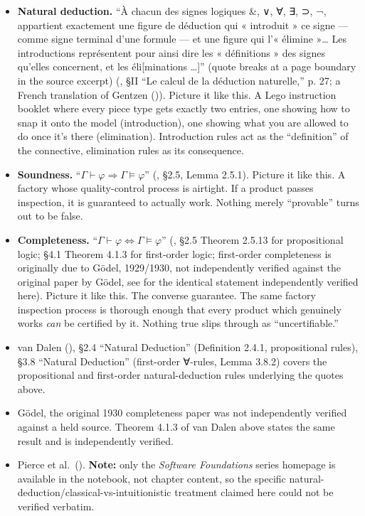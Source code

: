 \begin{itemize}
\tightlist
\item
  \textbf{Natural deduction.} ``À chacun des signes logiques \&, ∨, ∀, ∃, ⊃, ¬, appartient exactement une figure de déduction qui « introduit » ce signe --- comme signe terminal d'une formule --- et une figure qui l'« élimine »\ldots{} Les introductions représentent pour ainsi dire les « définitions » des signes qu'elles concernent, et les éli{[}minations \ldots{]}'' (quote breaks at a page boundary in the source excerpt) (\cite{FeysLadriere1955}, §II ``Le calcul de la déduction naturelle,'' p. 27; a French translation of Gentzen (\cite{Gentzen1935})). Picture it like this. A Lego instruction booklet where every piece type gets exactly two entries, one showing how to snap it onto the model (introduction), one showing what you are allowed to do once it's there (elimination). Introduction rules act as the ``definition'' of the connective, elimination rules as its consequence.
\item
  \textbf{Soundness.} ``\(\Gamma \vdash \varphi \Rightarrow \Gamma \models
  \varphi\)'' (\cite{VanDalen2013}, §2.5, Lemma 2.5.1). Picture it like this. A factory whose quality-control process is airtight. If a product passes inspection, it is guaranteed to actually work. Nothing merely ``provable'' turns out to be false.
\item
  \textbf{Completeness.} ``\(\Gamma \vdash \varphi \Leftrightarrow \Gamma
  \models \varphi\)'' (\cite{VanDalen2013}, §2.5 Theorem 2.5.13 for propositional logic; §4.1 Theorem 4.1.3 for first-order logic; first-order completeness is originally due to Gödel, 1929/1930, not independently verified against the original paper by Gödel, see \cite{VanDalen2013} for the identical statement independently verified here). Picture it like this. The converse guarantee. The same factory inspection process is thorough enough that every product which genuinely works \emph{can} be certified by it. Nothing true slips through as ``uncertifiable.''
\item
  van Dalen (\cite{VanDalen2013}), §2.4 ``Natural Deduction'' (Definition 2.4.1, propositional rules), §3.8 ``Natural Deduction'' (first-order ∀-rules, Lemma 3.8.2) covers the propositional and first-order natural-deduction rules underlying the quotes above.
\item
  Gödel, the original 1930 completeness paper was not independently verified against a held source. Theorem 4.1.3 of van Dalen above states the same result and is independently verified.
\item
  Pierce et al.~(\cite{PierceSF}). \textbf{Note:} only the \emph{Software Foundations} series homepage is available in the notebook, not chapter content, so the specific natural-deduction/classical-vs-intuitionistic treatment claimed here could not be verified verbatim.
\end{itemize}
